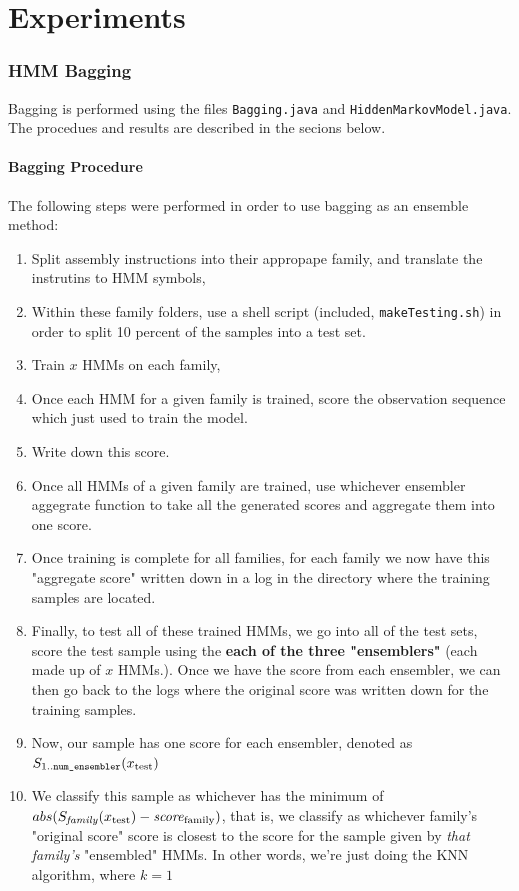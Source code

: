 \documentclass[12pt]{article}
\begin{document}
\part{Experiments}
\section{HMM Bagging}
  Bagging is performed using the files \texttt{Bagging.java} and \texttt{HiddenMarkovModel.java}. The procedues and results are described in the secions below.
\subsection{Bagging Procedure}
  The following steps were performed in order to use bagging as an ensemble method:
  \begin{enumerate}
    \item Split assembly instructions into their appropape family, and translate the instrutins to HMM symbols,
    \item Within these family folders, use a shell script (included, \texttt{makeTesting.sh}) in order to split 10 percent of the samples into a test set.
    \item Train $x$ HMMs on each family,
    \item Once each HMM for a given family is trained, score the observation sequence which just used to train the model.
    \item Write down this score. 
    \item Once all HMMs of a given family are trained, use whichever ensembler aggegrate function to take all the generated scores and aggregate them into one score. 
    \item Once training is complete for all families, for each family we now have this "aggregate score" written down in a log in the directory where the training samples are located.
    \item Finally, to test all of these trained HMMs, we go into all of the test sets, score the test sample using the \textbf{each of the three "ensemblers"} (each made up of $x$ HMMs.). Once we have the score from each ensembler, we can then go back to the logs where the original score was written down for the training samples. 
    \item Now, our sample has one score for each ensembler, denoted as $S_{1..\text{\texttt{num\_ensembler}}}(x_{\text{test}})$
    \item We classify this sample as whichever has the minimum of $abs(S_{\text{\textit{family}}}(x_{\text{test}}) - \text{\textit{score}}_\text{family} )$, that is, we classify as whichever family's "original score" score is closest to the score for the sample given by \textit{that family's} "ensembled" HMMs. In other words, we're just doing the KNN algorithm, where $k = 1$
  \end{enumerate}
\end{document}
